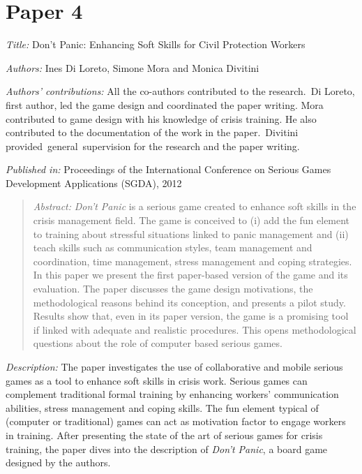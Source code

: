 \section[Don't Panic: Enhancing Soft Skills for Civil Protection Workers]{Paper 4}\label{paper-4}

\emph{Title:} Don't Panic: Enhancing Soft Skills for Civil Protection Workers

\emph{Authors:} Ines Di Loreto, Simone Mora and Monica Divitini

\emph{Authors' contributions:} All the co-authors contributed to the research.~Di Loreto, first author, led the game design and coordinated the paper writing. Mora contributed to game design with his knowledge of crisis training. He also contributed to the documentation of the work in the paper.~Divitini provided~general~supervision for the research and the paper writing.

\emph{Published in:} Proceedings of the International Conference on Serious Games Development Applications (SGDA), 2012
\begin{quote}
	\emph{Abstract:} \emph{Don't Panic} is a serious game created to enhance soft skills in the crisis management field. The game is conceived to (i) add the fun element to training about stressful situations linked to panic management and (ii) teach skills such as communication styles, team management and coordination, time management, stress management and coping strategies. In this paper we present the first paper-based version of the game and its evaluation. The paper discusses the game design motivations, the methodological reasons behind its conception, and presents a pilot study. Results show that, even in its paper version, the game is a promising tool if linked with adequate and realistic procedures. This opens methodological questions about the role of computer based serious games. 
\end{quote}

\emph{Description:} The paper investigates the use of collaborative and mobile serious games as a tool to enhance soft skills in crisis work. Serious games can complement traditional formal training by enhancing workers' communication abilities, stress management and coping skills. The fun element typical of (computer or traditional) games can act as motivation factor to engage workers in training. After presenting the state of the art of serious games for crisis training, the paper dives into the description of \emph{Don't Panic}, a board game designed by the authors. 

